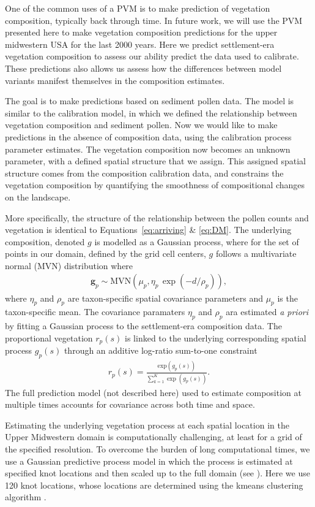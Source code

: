 \documentclass[12pt]{article}
\begin{document}
One of the common uses of a PVM is to make prediction of vegetation
composition, typically back through time. In future work, we will use
the PVM presented here to make vegetation composition predictions for
the upper midwestern USA for the last 2000 years. Here we predict
settlement-era vegetation composition to assess our ability predict
the data used to calibrate. These predictions also allows us assess
how the differences between model variants manifest themselves in the
composition estimates.

The goal is to make predictions based on sediment pollen data. The
model is similar to the calibration model, in which we defined the
relationship between vegetation composition and sediment pollen. Now
we would like to make predictions in the absence of composition data,
using the calibration process parameter estimates. The vegetation
composition now becomes an unknown parameter, with a defined spatial
structure that we assign. This assigned spatial structure comes from
the composition calibration data, and constrains the vegetation
composition by quantifying the smoothness of compositional changes on
the landscape.

More specifically, the structure of the relationship between the
pollen counts and vegetation is identical to
Equations~\ref{eq:arriving} \& \ref{eq:DM}. The underlying
composition, denoted $g$ is modelled as a Gaussian process, where for
the set of points in our domain, defined by the grid cell centers, $g$
follows a multivariate normal (MVN) distribution where
\begin{align*}
\bm{g}_p \sim \text{MVN}(\mu_p, \eta_p \, \exp(-d/\rho_p)),
\end{align*}
where $\eta_p$ and $\rho_p$ are taxon-specific spatial covariance
parameters and $\mu_p$ is the taxon-specific mean.  The covariance
paramaters $\eta_p$ and $\rho_p$ ara estimated \textit{a priori} by
fitting a Gaussian process to the settlement-era composition data.
The proportional vegetation $r_p(s)$ is linked to the underlying
corresponding spatial process $g_p(s)$ through an additive log-ratio
sum-to-one constraint
\begin{align*}
r_p(s) = \frac{ \text{exp}(g_p(s))}{ \sum_{k=1}^K \exp (g_p(s)) }.
\end{align*} 
The full prediction model (not described here) used to estimate
composition at multiple times accounts for covariance across both time
and space. 

Estimating the underlying vegetation process at each spatial location
in the Upper Midwestern domain is computationally challenging, at
least for a grid of the specified resolution. To overcome the burden
of long computational times, we use a Gaussian predictive process
model in which the process is estimated at specified knot locations
and then scaled up to the full domain (see
\cite{finley2009improving}). Here we use 120 knot locations, whose
locations are determined using the kmeans clustering algorithm
\cite{macqueen1967some}.
\end{document}
